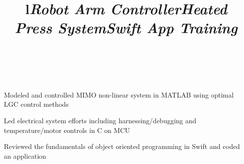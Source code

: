 \documentclass[mm]{res}
\begin{document}
\begin{resume}

\toprule

\section{\headingprojects}
\begin{format}
\title{l}\\
\body\\
\end{format}


\title{\textsl{Robot Arm Controller}}
\begin{position}
\tb Modeled and controlled MIMO non-linear system in MATLAB using optimal LGC control methods
\end{position}

\title{\textsl{Heated Press System}}
\begin{position}
\tb Led electrical system efforts including harnessing/debugging and temperature/motor controls in C on MCU
\end{position}


\title{\textsl{Swift App Training}}
\begin{position}
\tb Reviewed the fundamentals of object oriented programming in Swift and coded an application
\end{position}



\end{resume}
\end{document}
